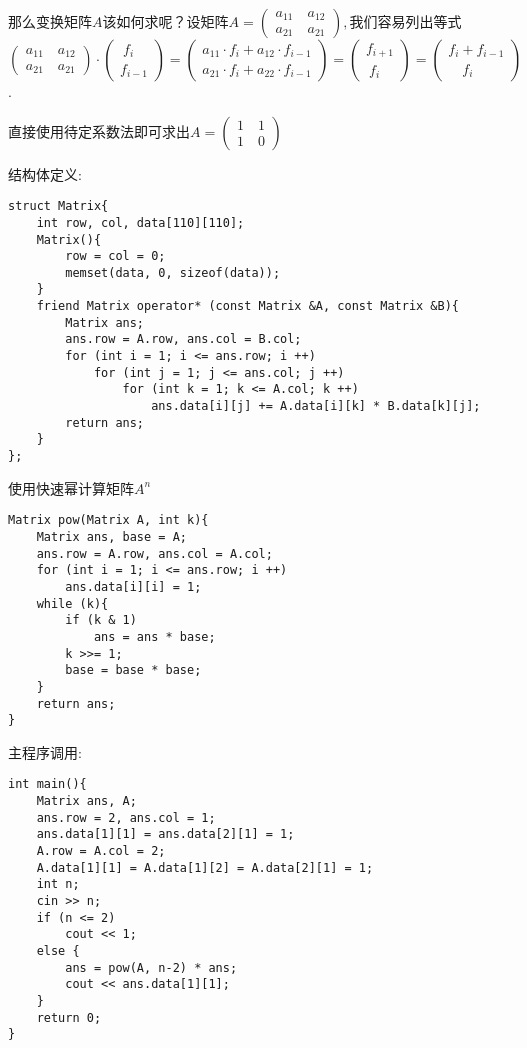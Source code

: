 \documentclass[UTF8]{article}
\begin{document}
那么变换矩阵$A$该如何求呢？设矩阵$A = \left(
\begin{array}{l}
a_{11} \quad a_{12}\\ 
a_{21} \quad a_{21}
\end{array}
\right),$我们容易列出等式
$$\left(
\begin{array}{l}
a_{11} \quad a_{12}\\ 
a_{21} \quad a_{21}
\end{array}
\right) \cdot \left(
\begin{array}{l}
\ f_i\\ 
f_{i-1}
\end{array}
\right) = \left(
\begin{array}{l}
a_{11}\cdot f_i + a_{12} \cdot f_{i-1}\\ 
a_{21}\cdot f_i + a_{22} \cdot f_{i-1}
\end{array}
\right) = \left(
\begin{array}{l}
f_{i+1}\\ 
\ f_i
\end{array}
\right) = \left(
\begin{array}{l}
f_i+ f_{i-1}\\ 
\quad f_i
\end{array}
\right)$$.

直接使用待定系数法即可求出$A = \left(
\begin{array}{l}
1 \quad 1\\ 
1 \quad 0
\end{array}
\right)$

结构体定义:

\begin{lstlisting}
struct Matrix{
	int row, col, data[110][110];
	Matrix(){
		row = col = 0;
		memset(data, 0, sizeof(data));
	}
	friend Matrix operator* (const Matrix &A, const Matrix &B){
		Matrix ans;
		ans.row = A.row, ans.col = B.col;
		for (int i = 1; i <= ans.row; i ++)
			for (int j = 1; j <= ans.col; j ++)
				for (int k = 1; k <= A.col; k ++)
					ans.data[i][j] += A.data[i][k] * B.data[k][j];
		return ans;
	}
};
\end{lstlisting}

\newpage
使用快速幂计算矩阵$A^n$

\begin{lstlisting}
Matrix pow(Matrix A, int k){
	Matrix ans, base = A;
	ans.row = A.row, ans.col = A.col;
	for (int i = 1; i <= ans.row; i ++)
		ans.data[i][i] = 1;
	while (k){
		if (k & 1)
			ans = ans * base;
		k >>= 1;
		base = base * base;
	}
	return ans;
}
\end{lstlisting}

主程序调用:
\begin{lstlisting}
int main(){
	Matrix ans, A;
	ans.row = 2, ans.col = 1;
	ans.data[1][1] = ans.data[2][1] = 1;
	A.row = A.col = 2;
	A.data[1][1] = A.data[1][2] = A.data[2][1] = 1;
	int n;
	cin >> n;
	if (n <= 2)
		cout << 1;
	else {
		ans = pow(A, n-2) * ans;
		cout << ans.data[1][1];
	}
	return 0;
}	
\end{lstlisting}
\end{document}
